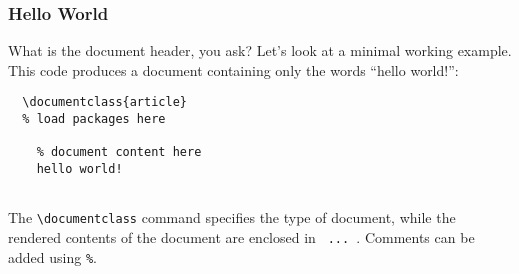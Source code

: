 \subsubsection{Hello World}
What is the document header, you ask?
Let's look at a minimal working example.
This code produces a document containing only the words ``hello world!'':
\begin{lstlisting}
  \documentclass{article}
  % load packages here
  
    % document content here
    hello world!
  
\end{lstlisting}
The \lstinline|\documentclass| command specifies the type of document,
while the rendered contents of the document are enclosed in
\lstinline| ... |.
Comments can be added using \lstinline|%|.
